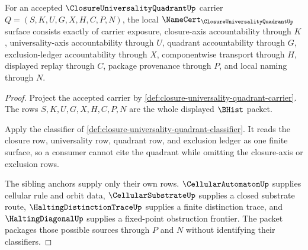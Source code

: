 \begin{theorem}
\label{thm:closure-universality-quadrant-certificate-surface}
For an accepted $\ClosureUniversalityQuadrantUp$ carrier $Q=(S,K,U,G,X,H,C,P,N)$, the local $\NameCert_{\ClosureUniversalityQuadrantUp}$ surface consists exactly of carrier exposure, closure-axis accountability through $K$, universality-axis accountability through $U$, quadrant accountability through $G$, exclusion-ledger accountability through $X$, componentwise transport through $H$, displayed replay through $C$, package provenance through $P$, and local naming through $N$.
\end{theorem}
\begin{proof}
Project the accepted carrier by \autoref{def:closure-universality-quadrant-carrier}. The rows $S,K,U,G,X,H,C,P,N$ are the whole displayed $\BHist$ packet.

Apply the classifier of \autoref{def:closure-universality-quadrant-classifier}. It reads the closure row, universality row, quadrant row, and exclusion ledger as one finite surface, so a consumer cannot cite the quadrant while omitting the closure-axis or exclusion rows.

The sibling anchors supply only their own rows. $\CellularAutomatonUp$ supplies cellular rule and orbit data, $\CellularSubstrateUp$ supplies a closed substrate route, $\HaltingDistinctionTraceUp$ supplies a finite distinction trace, and $\HaltingDiagonalUp$ supplies a fixed-point obstruction frontier. The packet packages those possible sources through $P$ and $N$ without identifying their classifiers.
\end{proof}

